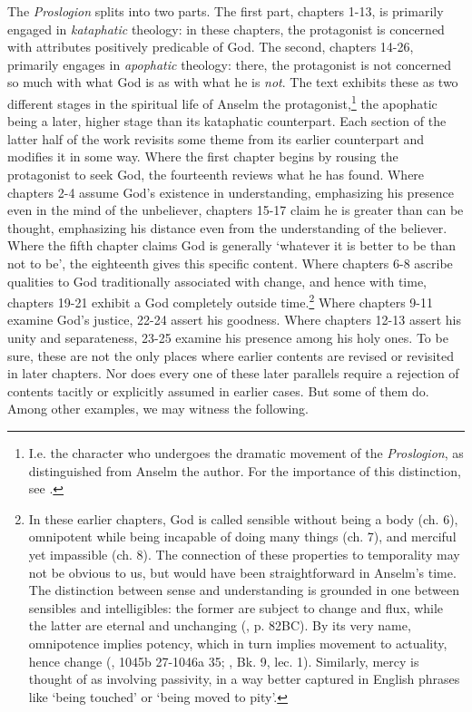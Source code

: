 \documentclass[]{birkjour}
\begin{document}
The \textit{Proslogion} splits into two parts. The first part, chapters 1-13, is primarily engaged in \textit{kataphatic} theology: in these chapters, the protagonist is concerned with attributes positively predicable of God. The second, chapters 14-26, primarily engages in \textit{apophatic} theology: there, the protagonist is not concerned so much with what God is as with what he is \textit{not}. The text exhibits these as two different stages in the spiritual life of Anselm the protagonist,\footnote{I.e. the character who undergoes the dramatic movement of the \textit{Proslogion}, as distinguished from Anselm the author. For the importance of this distinction, see \cite{McMahon2004}.} the apophatic being a later, higher stage than its kataphatic counterpart. Each section of the latter half of the work revisits some theme from its earlier counterpart and modifies it in some way. Where the first chapter begins by rousing the protagonist to seek God, the fourteenth reviews what he has found. Where chapters 2-4 assume God's existence in understanding, emphasizing his presence even in the mind of the unbeliever, chapters 15-17 claim he is greater than can be thought, emphasizing his distance even from the understanding of the believer. Where the fifth chapter claims God is generally `whatever it is better to be than not to be', the eighteenth gives this specific content. Where chapters 6-8 ascribe qualities to God traditionally associated with change, and hence with time, chapters 19-21 exhibit a God completely outside time.\footnote{In these earlier chapters, God is called sensible without being a body (ch. 6), omnipotent while being incapable of doing many things (ch. 7), and merciful yet impassible (ch. 8). The connection of these properties to temporality may not be obvious to us, but would have been straightforward in Anselm's time. The distinction between sense and understanding is grounded in one between sensibles and intelligibles: the former are subject to change and flux, while the latter are eternal and unchanging (\cite{BCP}, p. 82BC). By its very name, omnipotence implies potency, which in turn implies movement to actuality, hence change (\cite{Metaph}, 1045b 27-1046a 35; \cite{AquinasMetaph}, Bk. 9, lec. 1). Similarly, mercy is thought of as involving passivity, in a way better captured in English phrases like `being touched' or `being moved to pity'.} Where chapters 9-11 examine God's justice, 22-24 assert his goodness. Where chapters 12-13 assert his unity and separateness, 23-25 examine his presence among his holy ones. To be sure, these are not the only places where earlier contents are revised or revisited in later chapters. Nor does every one of these later parallels require a rejection of contents tacitly or explicitly assumed in earlier cases. But some of them do. Among other examples, we may witness the following.
	
\end{document}
